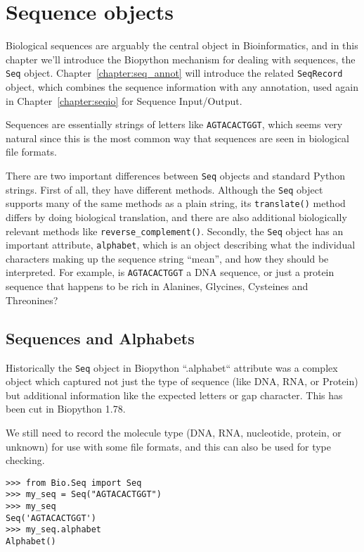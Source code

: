 \chapter{Sequence objects}
\label{chapter:seq_objects}

Biological sequences are arguably the central object in Bioinformatics, and in this chapter we'll introduce the Biopython mechanism for dealing with sequences, the \verb|Seq| object.
Chapter~\ref{chapter:seq_annot} will introduce the related \verb|SeqRecord| object, which combines the sequence information with any annotation, used again in Chapter~\ref{chapter:seqio} for Sequence Input/Output.

Sequences are essentially strings of letters like \verb|AGTACACTGGT|, which seems very natural since this is the most common way that sequences are seen in biological file formats.

There are two important differences between \verb|Seq| objects and standard Python strings.
First of all, they have different methods.  Although the \verb|Seq| object supports many of the same methods as a plain string, its \verb|translate()| method differs by doing biological translation, and there are also additional biologically relevant methods like \verb|reverse_complement()|.
Secondly, the \verb|Seq| object has an important attribute, \verb|alphabet|, which is an object describing what the individual characters making up the sequence string ``mean'', and how they should be interpreted.  For example, is \verb|AGTACACTGGT| a DNA sequence, or just a protein sequence that happens to be rich in Alanines, Glycines, Cysteines
and Threonines?

\section{Sequences and Alphabets}

Historically the \verb|Seq| object in Biopython ``.alphabet`` attribute was a
complex object which captured not just the type of sequence (like DNA, RNA, or
Protein) but additional information like the expected letters or gap character.
This has been cut in Biopython 1.78.

We still need to record the molecule type (DNA, RNA, nucleotide, protein, or
unknown) for use with some file formats, and this can also be used for type
checking.

\begin{verbatim}
>>> from Bio.Seq import Seq
>>> my_seq = Seq("AGTACACTGGT")
>>> my_seq
Seq('AGTACACTGGT')
>>> my_seq.alphabet
Alphabet()
\end{verbatim}

